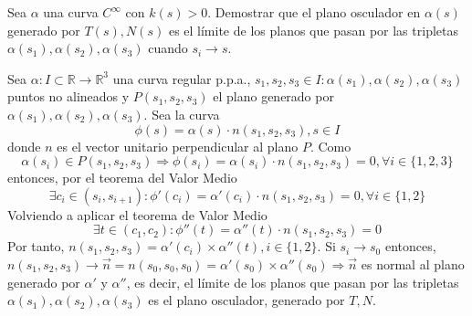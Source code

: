 \begin{ejr}[40]
  Sea $\alpha$ una curva $C^{\infty}$ con $k(s)>0$. Demostrar que el plano osculador en $\alpha(s)$ generado por $T(s), N(s)$ es el límite de los planos que pasan por las tripletas $\alpha(s_{1}), \alpha(s_{2}), \alpha(s_{3})$ cuando $s_{i} \rightarrow s$.
\end{ejr}

\begin{sol}[40]
  Sea $\alpha: I \subset \mathbb{R} \to \mathbb{R}^{3}$ una curva regular p.p.a., $s_{1}, s_{2}, s_{3} \in I : \alpha(s_{1}), \alpha(s_{2}), \alpha(s_{3})$ puntos no alineados y $P(s_{1}, s_{2}, s_{3})$ el plano generado por $\alpha(s_{1}), \alpha(s_{2}), \alpha(s_{3})$. Sea la curva
  \[
    \phi(s) = \alpha(s) \cdot n(s_{1}, s_{2}, s_{3}), s \in I
  \]
  donde $n$ es el vector unitario perpendicular al plano $P$. Como
  \[
    \alpha(s_{i}) \in P(s_{1},s_{2},s_{3})  \Rightarrow \phi(s_{i}) = \alpha(s_{i}) \cdot n(s_{1}, s_{2}, s_{3}) = 0, \forall i \in \{ 1, 2, 3 \}
  \]
  entonces, por el teorema del Valor Medio
  \[
    \exists c_{i} \in (s_{i},s_{i+1}): \phi'(c_{i})= \alpha'(c_{i}) \cdot n(s_{1}, s_{2}, s_{3}) = 0, \forall i \in \{ 1, 2 \}
  \]
  Volviendo a aplicar el teorema de Valor Medio
  \[
    \exists t \in (c_{1},c_{2}) : \phi''(t) = \alpha''(t) \cdot n(s_{1},s_{2},s_{3}) = 0
  \]
  Por tanto, $n(s_{1}, s_{2}, s_{3}) = \alpha'(c_{i}) \times \alpha''(t), i \in \{ 1, 2 \}$. Si $s_{i} \rightarrow s_{0}$ entonces, $ n(s_{1}, s_{2}, s_{3}) \rightarrow \vec{n} = n(s_{0},s_{0},s_{0}) = \alpha'(s_{0}) \times \alpha''(s_{0}) \Rightarrow \vec{n}$ es normal al plano generado por $\alpha'$ y $\alpha''$, es decir, el límite de los planos que pasan por las tripletas $\alpha(s_{1}), \alpha(s_{2}), \alpha(s_{3})$ es el plano osculador, generado por $T, N$.
\end{sol}
